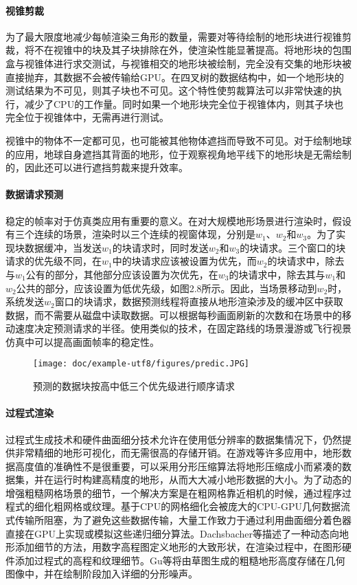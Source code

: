 \paragraph{视锥剪裁}
为了最大限度地减少每帧渲染三角形的数量，需要对等待绘制的地形块进行视锥剪裁，将不在视锥中的块及其子块排除在外，使渲染性能显著提高。将地形块的包围盒与视锥体进行求交测试，与视锥相交的地形块被绘制，完全没有交集的地形块被直接抛弃，其数据不会被传输给GPU。在四叉树的数据结构中，如一个地形块的测试结果为不可见，则其子块也不可见。这个特性使剪裁算法可以非常快速的执行，减少了CPU的工作量。同时如果一个地形块完全位于视锥体内，则其子块也完全位于视锥体中，无需再进行测试。\par
视锥中的物体不一定都可见，也可能被其他物体遮挡而导致不可见。对于绘制地球的应用，地球自身遮挡其背面的地形，位于观察视角地平线下的地形块是无需绘制的，因此还可以进行遮挡剪裁来提升效率。

\paragraph{数据请求预测}
稳定的帧率对于仿真类应用有重要的意义。在对大规模地形场景进行渲染时，假设有三个连续的场景，渲染时以三个连续的视窗体现，分别是$w_1$、$w_2$和$w_3$。为了实现块数据缓冲，当发送$w_1$的块请求时，同时发送$w_2$和$w_3$的块请求。三个窗口的块请求的优先级不同，在$w_1$中的块请求应该被设置为优先，而$w_2$的块请求中，除去与$w_1$公有的部分，其他部分应该设置为次优先，在$w_3$的块请求中，除去其与$w_1$和$w_2$公共的部分，应该设置为低优先级，如图2.8所示。因此，当场景移动到$w_2$时，系统发送$w_2$窗口的块请求，数据预测线程将直接从地形渲染涉及的缓冲区中获取数据，而不需要从磁盘中读取数据。可以根据每秒画面刷新的次数和在场景中的移动速度决定预测请求的半径。使用类似的技术，在固定路线的场景漫游或飞行视景仿真中可以提高画面帧率的稳定性。\supercite{Chen2010Design}
\begin{figure}[htbp]
\centering
\texttt{[image: doc/example-utf8/figures/predic.JPG]}
\caption{预测的数据块按高中低三个优先级进行顺序请求}
\end{figure}

\paragraph{过程式渲染}
过程式生成技术和硬件曲面细分技术允许在使用低分辨率的数据集情况下，仍然提供非常精细的地形可视化，而无需很高的存储开销。在游戏等许多应用中，地形数据高度值的准确性不是很重要，可以采用分形压缩算法将地形压缩成小而紧凑的数据集，并在运行时构建高精度的地形，从而大大减小地形数据的大小。为了动态的增强粗糙网格场景的细节，一个解决方案是在粗网格靠近相机的时候，通过程序过程式的细化粗网格或纹理。基于CPU的网格细化会被庞大的CPU-GPU几何数据流式传输所阻塞，为了避免这些数据传输，大量工作致力于通过利用曲面细分着色器直接在GPU上实现或模拟这些递归细分算法。Dachsbacher等\supercite{Dachsbacher2004Rendering}描述了一种动态向地形添加细节的方法，用数字高程图定义地形的大致形状，在渲染过程中，在图形硬件添加过程式的高程和纹理细节。Gu等\supercite{GuGeometry}将由草图生成的粗糙地形高度存储在几何图像中，并在绘制阶段加入详细的分形噪声。\par

